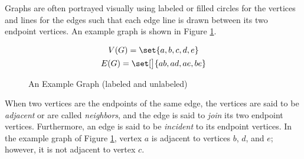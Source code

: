 Graphs are often portrayed visually using labeled or filled circles for the vertices and lines for the edges such
that each edge line is drawn between its two endpoint vertices.  An example graph is shown in Figure
\ref{fig:exgraph}.

\begin{figure}[h]
  \label{fig:exgraph}
  \begin{minipage}{3in}
    \vspace{0in}
    \begin{center}
    \end{center}
  \end{minipage}
  \begin{minipage}{3in}
    \vspace{0in}
    \begin{center}
    \end{center}
  \end{minipage}
  \begin{gather*}
    V(G)=\set{a,b,c,d,e} \\
    E(G)=\set[\big]{ab,ad,ae,be}
  \end{gather*}
  \caption{An Example Graph (labeled and unlabeled)}
\end{figure}

When two vertices are the endpoints of the same edge, the vertices are said to be \emph{adjacent} or are called
\emph{neighbors}, and the edge is said to \emph{join} its two endpoint vertices.  Furthermore, an edge is said to
be \emph{incident} to its endpoint vertices.  In the example graph of Figure \ref{fig:exgraph}, vertex \(a\) is
adjacent to vertices \(b\), \(d\), and \(e\); however, it is not adjacent to vertex \(c\).

